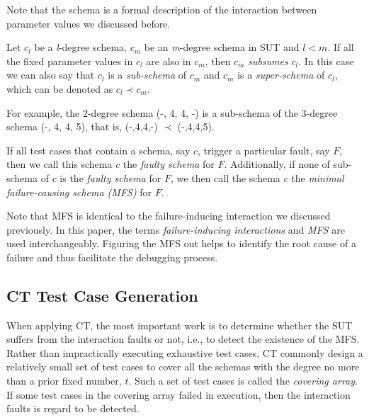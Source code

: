 \documentclass{sig-alternate}
\begin{document}
Note that the schema is a formal description of the interaction between parameter values we discussed before.

\begin{definition}
Let $c_{l}$ be a \emph{l}-degree schema, $c_{m}$ be an \emph{m}-degree schema in SUT and $l < m$. If all the fixed parameter values in $c_{l}$ are also in $c_{m}$, then $c_{m}$ \emph{subsumes} $c_{l}$. In this case we can also say that $c_{l}$ is a \emph{sub-schema} of $c_{m}$ and $c_{m}$ is a \emph{super-schema} of $c_{l}$, which can be denoted as $c_{l} \prec  c_{m}$.
\end{definition}

For example,  the 2-degree schema (-, 4, 4, -) is a sub-schema of the 3-degree schema (-, 4, 4, 5), that is, (-,4,4,-) $\prec$ (-,4,4,5).

\begin{definition}
If all test cases that contain a schema, say $c$, trigger a particular fault, say $F$, then we call this schema $c$ the \emph{faulty schema} for $F$. Additionally, if none of sub-schema of $c$ is the \emph{faulty schema} for $F$, we then call the schema $c$ the \emph{minimal failure-causing schema (MFS)} \cite{nie2011minimal} for $F$.

\end{definition}

Note that MFS is identical to the failure-inducing interaction we discussed previously. In this paper, the terms \emph{failure-inducing interactions} and \emph{MFS} are used interchangeably. Figuring the MFS out helps to identify the root cause of a failure and thus facilitate the debugging process.

\subsection{CT Test Case Generation}
When applying CT, the most important work is to determine whether the SUT suffers from the interaction faults or not, i.e., to  detect the existence of the MFS. Rather than impractically executing exhaustive test cases, CT commonly design a relatively small set of test cases to cover all the schemas with the degree no more than a prior fixed number, $t$. Such a set of test cases is called the \emph{covering array}.  If some test cases in the covering array failed in execution, then the interaction faults is regard to be detected.
\end{document}
